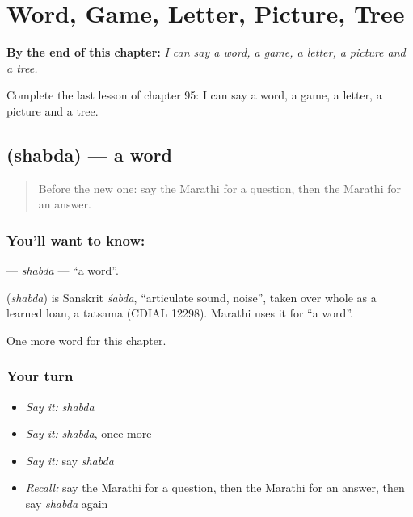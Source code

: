 
\chapter{Word, Game, Letter, Picture, Tree}
\label{ch:mr-word-game-letter-picture-tree}

\begin{chapteropening}
\textbf{By the end of this chapter:} \emph{I can say a word, a game, a letter, a picture and a tree.}

Complete the last lesson of chapter 95: I can say a word, a game, a letter, a picture and a tree.
\end{chapteropening}

\section[\texorpdfstring{\mr{शब्द} (shabda)}{शब्द (shabda)}]{ (shabda) — a word}

\label{lesson:MR-C95-shabda}



\begin{quote}
Before the new one: say the Marathi for a question, then the Marathi for an answer.
\end{quote}

\subsection*{You'll want to know: }
\textbf{} — \emph{shabda} — \textquotedblleft{}a word\textquotedblright{}.

\begin{cousinweb}
\textbf{} (\emph{shabda}) is Sanskrit \emph{śabda}, \textquotedblleft{}articulate sound, noise\textquotedblright{}, taken over whole as a learned loan, a tatsama (CDIAL 12298). Marathi uses it for \textquotedblleft{}a word\textquotedblright{}.
\end{cousinweb}

\begin{grammarlens}[title={What you've built}]
One more word for this chapter.
\end{grammarlens}

\subsection*{Your turn}
\begin{itemize}
\raggedright
  \item \emph{Say it:} \emph{shabda}
  \item \emph{Say it:} \emph{shabda}, once more
  \item \emph{Say it:} say \emph{shabda}
  \item \emph{Recall:} say the Marathi for a question, then the Marathi for an answer, then say \emph{shabda} again
\end{itemize}

